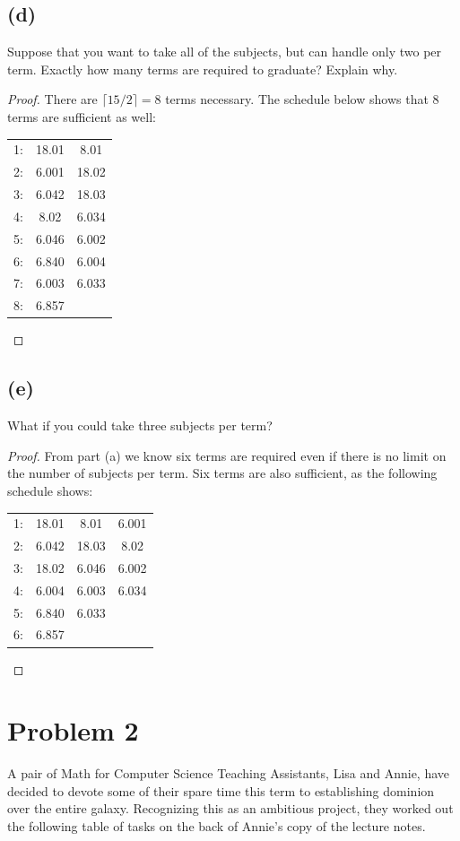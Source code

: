 \documentclass[14pt]{extarticle}
\begin{document}
\subsection{(d)}
Suppose that you want to take all of the subjects, but can handle only two per term. Exactly how many terms are required to graduate? Explain why.
\begin{proof}
There are $\lceil15/2\rceil = 8$ terms necessary. The schedule below shows that 8 terms are sufficient as well:

\begin{center}
\begin{tabular}{lcc}
1: & 18.01 & 8.01\\
2: & 6.001 & 18.02\\
3: & 6.042 & 18.03\\
4: & 8.02 & 6.034\\
5: & 6.046 & 6.002\\
6: & 6.840 & 6.004\\
7: & 6.003 & 6.033\\
8: & 6.857
\end{tabular}
\end{center}
\end{proof}

\subsection{(e)}
What if you could take three subjects per term?
\begin{proof}
From part (a) we know six terms are required even if there is no limit on the number of subjects per term. Six terms are also sufficient, as the following schedule shows:

\begin{center}
\begin{tabular}{lccc}
1: & 18.01 & 8.01 & 6.001 \\
2: & 6.042 & 18.03 & 8.02 \\
3: & 18.02 & 6.046 & 6.002 \\
4: & 6.004 & 6.003 & 6.034 \\
5: & 6.840 & 6.033 &\\
6: & 6.857 &  &
\end{tabular}
\end{center}
\end{proof}

\section{Problem 2}
A pair of Math for Computer Science Teaching Assistants, Lisa and Annie, have decided to devote some of their spare time this term to establishing dominion over the entire galaxy. Recognizing this as an ambitious project, they worked out the following table of tasks on the back of Annie’s copy of the lecture notes.
\end{document}
